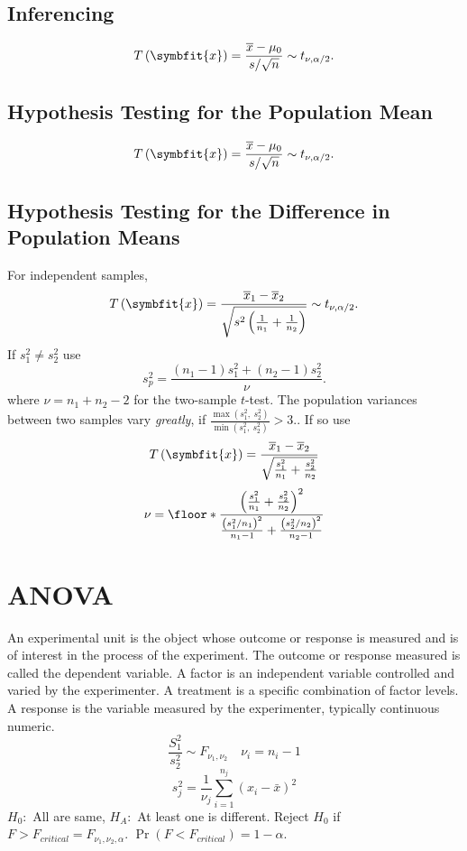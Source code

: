 \documentclass{article}
\begin{document}
\begin{multicols}{3}
\subsection{Inferencing}
\begin{equation*}
    T\left( \symbfit{x} \right) = \frac{\overline{x} - \mu_0}{s / \sqrt{n}} \sim t_{\nu, \alpha/2}.
\end{equation*}
\subsection{Hypothesis Testing for the Population Mean}
\begin{equation*}
    T\left( \symbfit{x} \right) = \frac{\overline{x} - \mu_0}{s/\sqrt{n}} \sim t_{\nu, \alpha/2}.
\end{equation*}
\subsection{Hypothesis Testing for the Difference in Population Means}
For independent samples,
\begin{equation*}
    T\left( \symbfit{x} \right) = \frac{\overline{x}_1 - \overline{x}_2}{\sqrt{s^2\left( \frac{1}{n_1} + \frac{1}{n_2} \right)}} \sim t_{\nu, \alpha/2}.
\end{equation*}
If \(s_1^2 \ne s_2^2\) use 
\begin{equation*}
    s_p^2 = \frac{\left( n_1 - 1 \right)s_1^2 + \left( n_2 - 1 \right)s_2^2}{\nu}.
\end{equation*}
where \(\nu = n_1 + n_2 - 2\) for the two-sample \(t\)-test.
The population variances between two samples vary \textit{greatly}, if
\(
    \frac{\max{\left( s_1^2,\: s_2^2 \right)}}{\min{\left( s_1^2,\: s_2^2 \right)}} > 3.
    \).
If so use
\begin{equation*}
    T\left( \symbfit{x} \right) = \frac{\overline{x}_1 - \overline{x}_2 }{\sqrt{\frac{s_1^2}{n_1} + \frac{s_2^2}{n_2}}}
\end{equation*}
\begin{equation*}
    \nu = \floor*{\frac{\left( \frac{s_1^2}{n_1} + \frac{s_2^2}{n_2} \right)^2}{\frac{\left( s_1^2 / n_1 \right)^2}{n_1 - 1} + \frac{\left( s_2^2 / n_2 \right)^2}{n_2 - 1}}}
\end{equation*}


\section{ANOVA}
An experimental unit is the object whose outcome or response is measured and is of interest in the process of the experiment.
The outcome or response measured is called the dependent variable.
A factor is an independent variable controlled and varied by the experimenter.
A treatment is a specific combination of factor levels.
A response is the variable measured by the experimenter, typically continuous numeric.
\[
    \frac{S^2_1}{s^2_2} \sim F_{\nu_1,\nu_2} \quad \nu_i=n_i-1
\]
\[
    s^2_j = \frac{1}{\nu_j} \sum_{i=1}^{n_j} \left( x_i - \bar{x} \right)^2
\]
\(H_0:\) All are same, \(H_A:\) At least one is different.
Reject \(H_0\) if \(F>F_{critical}=F_{\nu_1,\nu_2,\alpha}\).
\(\Pr\left( F<F_{critical} \right)=1-\alpha\).

\end{multicols}
\end{document}
